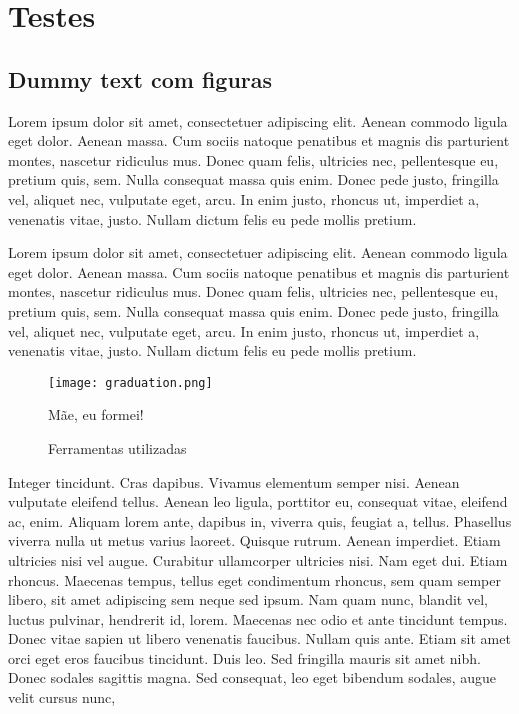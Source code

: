 \chapter{Testes}  
\label{chap: testes}

\section{Dummy text com figuras}

Lorem ipsum dolor sit amet, consectetuer adipiscing elit. Aenean commodo ligula eget dolor. Aenean massa. Cum sociis natoque penatibus et magnis dis parturient montes, nascetur ridiculus mus. Donec quam felis, ultricies nec, pellentesque eu, pretium quis, sem. Nulla consequat massa quis enim. Donec pede justo, fringilla vel, aliquet nec, vulputate eget, arcu. In enim justo, rhoncus ut, imperdiet a, venenatis vitae, justo. Nullam dictum felis eu pede mollis pretium.

Lorem ipsum dolor sit amet, consectetuer adipiscing elit. Aenean commodo ligula eget dolor. Aenean massa. Cum sociis natoque penatibus et magnis dis parturient montes, nascetur ridiculus mus. Donec quam felis, ultricies nec, pellentesque eu, pretium quis, sem. Nulla consequat massa quis enim. Donec pede justo, fringilla vel, aliquet nec, vulputate eget, arcu. In enim justo, rhoncus ut, imperdiet a, venenatis vitae, justo. Nullam dictum felis eu pede mollis pretium.

\begin{figure}[ht]
  \caption{Mãe, eu formei!}
  \label{fig: fig1}
  \centering
  \texttt{[image: graduation.png]}
  
\end{figure}

\begin{figure}[ht]
  \caption{Ferramentas utilizadas}
  \label{fig: fig2}
  \centering
  \hfill
  \hfill
  
\end{figure}

Integer tincidunt. Cras dapibus. Vivamus elementum semper nisi. Aenean vulputate eleifend tellus. Aenean leo ligula, porttitor eu, consequat vitae, eleifend ac, enim. Aliquam lorem ante, dapibus in, viverra quis, feugiat a, tellus. Phasellus viverra nulla ut metus varius laoreet. Quisque rutrum. Aenean imperdiet. Etiam ultricies nisi vel augue. Curabitur ullamcorper ultricies nisi. Nam eget dui. Etiam rhoncus. Maecenas tempus, tellus eget condimentum rhoncus, sem quam semper libero, sit amet adipiscing sem neque sed ipsum. Nam quam nunc, blandit vel, luctus pulvinar, hendrerit id, lorem. Maecenas nec odio et ante tincidunt tempus. Donec vitae sapien ut libero venenatis faucibus. Nullam quis ante. Etiam sit amet orci eget eros faucibus tincidunt. Duis leo. Sed fringilla mauris sit amet nibh. Donec sodales sagittis magna. Sed consequat, leo eget bibendum sodales, augue velit cursus nunc,

